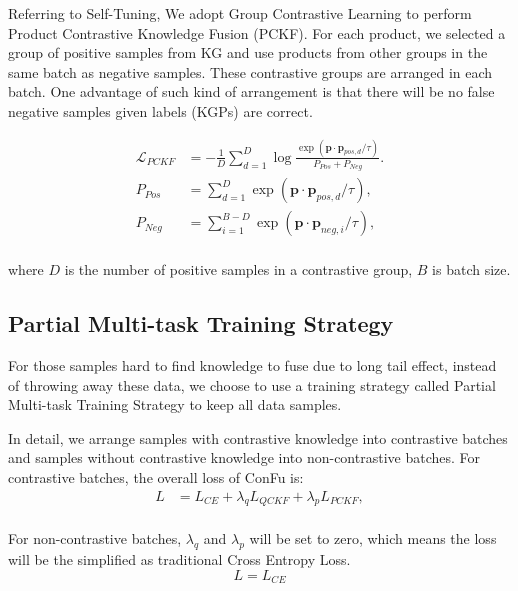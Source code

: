 Referring to Self-Tuning\cite{wang21}, We adopt Group Contrastive Learning to perform Product Contrastive Knowledge Fusion (PCKF). For each product, we selected a group of positive samples from KG and use products from other groups in the same batch as negative samples. These contrastive groups are arranged in each batch. One advantage of such kind of arrangement is that there will be no false negative samples given labels (KGPs) are correct.

\begin{equation}
    \begin{aligned}
    \mathcal{L}_{PCKF}&=-\frac{1}{D}\sum_{d=1}^{D}{\log\frac{\exp(\mathbf{p}\cdot\mathbf{p}_{pos,d}/\tau)}{P_{Pos}+P_{Neg}}}. \\
    P_{Pos}&=\sum_{d=1}^{D}{\exp(\mathbf{p}\cdot\mathbf{p}_{pos, d}/\tau)}, \\
    P_{Neg}&=\sum_{i=1}^{B-D}
    {\exp(\mathbf{p}\cdot\mathbf{p}_{neg,i}/\tau)},\\
    \end{aligned}
\end{equation}

\noindent where $D$ is the number of positive samples in a contrastive group, $B$ is batch size.

\subsection{Partial Multi-task Training Strategy}
For those samples hard to find knowledge to fuse due to long tail effect, instead of throwing away these data, we choose to use a training strategy called Partial Multi-task Training Strategy to keep all data samples. 

In detail, we arrange samples with contrastive knowledge into contrastive batches and samples without contrastive knowledge into non-contrastive batches. For contrastive batches, the overall loss of ConFu is:
\begin{equation}
    \begin{aligned}
    L&= L_{CE} + \lambda_q L_{QCKF} + \lambda_p L_{PCKF}, \\
    \end{aligned}
\end{equation}

For non-contrastive batches, $\lambda_q$ and $\lambda_p$ will be set to zero, which means the loss will be the simplified as traditional Cross Entropy Loss.
\begin{equation}
    L = L_{CE}
\end{equation}

